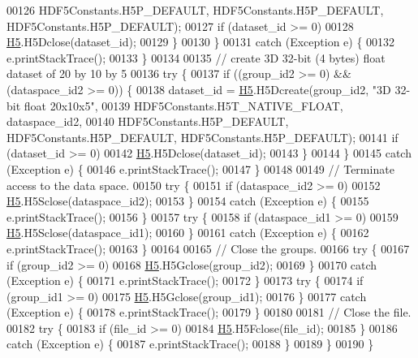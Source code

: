 \begin{DoxyCode}
00126                         HDF5Constants.H5P\_DEFAULT, HDF5Constants.H5P\_DEFAULT, HDF5Constants.H5P\_DEFAULT);
00127                 \textcolor{keywordflow}{if} (dataset\_id >= 0)
00128                     \hyperlink{namespace_h5}{H5}.H5Dclose(dataset\_id);
00129             \}
00130         \}
00131         \textcolor{keywordflow}{catch} (Exception e) \{
00132             e.printStackTrace();
00133         \}
00134 
00135         \textcolor{comment}{// create 3D 32-bit (4 bytes) float dataset of 20 by 10 by 5}
00136         \textcolor{keywordflow}{try} \{
00137             \textcolor{keywordflow}{if} ((group\_id2 >= 0) && (dataspace\_id2 >= 0)) \{
00138                 dataset\_id = \hyperlink{namespace_h5}{H5}.H5Dcreate(group\_id2, \textcolor{stringliteral}{"3D 32-bit float  20x10x5"},
00139                         HDF5Constants.H5T\_NATIVE\_FLOAT, dataspace\_id2,
00140                         HDF5Constants.H5P\_DEFAULT, HDF5Constants.H5P\_DEFAULT, HDF5Constants.H5P\_DEFAULT);
00141                 \textcolor{keywordflow}{if} (dataset\_id >= 0)
00142                     \hyperlink{namespace_h5}{H5}.H5Dclose(dataset\_id);
00143             \}
00144         \}
00145         \textcolor{keywordflow}{catch} (Exception e) \{
00146             e.printStackTrace();
00147         \}
00148 
00149         \textcolor{comment}{// Terminate access to the data space.}
00150         \textcolor{keywordflow}{try} \{
00151             \textcolor{keywordflow}{if} (dataspace\_id2 >= 0)
00152                 \hyperlink{namespace_h5}{H5}.H5Sclose(dataspace\_id2);
00153         \}
00154         \textcolor{keywordflow}{catch} (Exception e) \{
00155             e.printStackTrace();
00156         \}
00157         \textcolor{keywordflow}{try} \{
00158             \textcolor{keywordflow}{if} (dataspace\_id1 >= 0)
00159                 \hyperlink{namespace_h5}{H5}.H5Sclose(dataspace\_id1);
00160         \}
00161         \textcolor{keywordflow}{catch} (Exception e) \{
00162             e.printStackTrace();
00163         \}
00164 
00165         \textcolor{comment}{// Close the groups.}
00166         \textcolor{keywordflow}{try} \{
00167             \textcolor{keywordflow}{if} (group\_id2 >= 0)
00168                 \hyperlink{namespace_h5}{H5}.H5Gclose(group\_id2);
00169         \}
00170         \textcolor{keywordflow}{catch} (Exception e) \{
00171             e.printStackTrace();
00172         \}
00173         \textcolor{keywordflow}{try} \{
00174             \textcolor{keywordflow}{if} (group\_id1 >= 0)
00175                 \hyperlink{namespace_h5}{H5}.H5Gclose(group\_id1);
00176         \}
00177         \textcolor{keywordflow}{catch} (Exception e) \{
00178             e.printStackTrace();
00179         \}
00180 
00181         \textcolor{comment}{// Close the file.}
00182         \textcolor{keywordflow}{try} \{
00183             \textcolor{keywordflow}{if} (file\_id >= 0)
00184                 \hyperlink{namespace_h5}{H5}.H5Fclose(file\_id);
00185         \}
00186         \textcolor{keywordflow}{catch} (Exception e) \{
00187             e.printStackTrace();
00188         \}
00189     \}
00190 \}
\end{DoxyCode}
